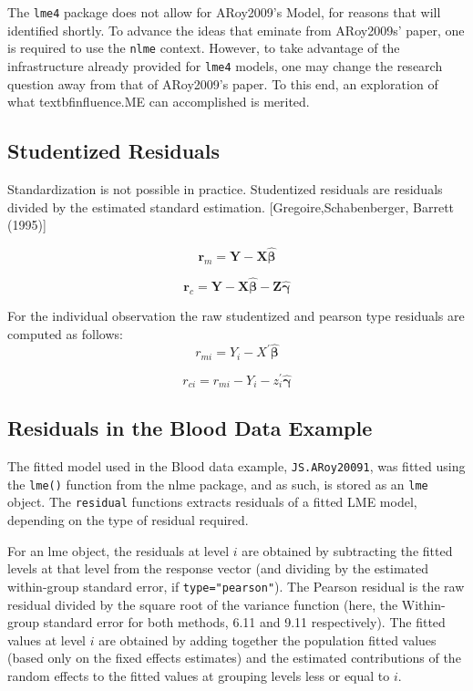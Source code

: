 \documentclass[12pt, a4paper]{report}
\theoremstyle{plain}
\theoremstyle{definition}
\theoremstyle{remark}
\begin{document}
	The \texttt{lme4} package does not allow for ARoy2009's Model, for reasons that will identified shortly.
	To advance the ideas that eminate from ARoy2009s' paper, one is required to use the \texttt{nlme} context. However, to take advantage of the infrastructure already provided for \texttt{lme4} models, one may change the research question away from that of ARoy2009's paper. 
	To this end, an exploration of what textbf{influence.ME} can accomplished is merited.
	\subsection{Studentized Residuals}
	Standardization is not possible in practice. Studentized residuals are residuals divided by the estimated standard estimation.
	[Gregoire,Schabenberger, Barrett (1995)]
	
	\[\boldsymbol{r}_{m} = \boldsymbol{Y} -  \boldsymbol{X} \boldsymbol{\hat{\beta}} \]
	
	\[\boldsymbol{r}_{c} = \boldsymbol{Y} -  \boldsymbol{X} \boldsymbol{\hat{\beta}} -  \boldsymbol{Z} \boldsymbol{\hat{\gamma}}\]
	
	For the individual observation the raw studentized and pearson type residuals are computed as follows:
	\[r_{mi} =Y_{i} -X^{\prime} \boldsymbol{\hat{\beta}}\]
	
	\[r_{ci} = r_{mi} - Y_{i} - z_{i}^{\prime} \boldsymbol{\hat{\gamma}}\]
	
	
	\subsection{Residuals in the Blood Data Example}
	The fitted model used in the Blood data example, \texttt{JS.ARoy20091}, was fitted using the \texttt{lme()} function from the nlme package, and as such, is stored as an \texttt{lme} object. The \texttt{residual} functions extracts residuals of a fitted LME model, depending on the type of residual required.
	
	For an lme object, the residuals at level $i$ are obtained by subtracting the fitted levels at that level from the response vector (and dividing by the estimated within-group standard error, if \texttt{type="pearson"}). The Pearson residual is the raw residual divided by the square root of the variance function (here, the Within-group standard error for both methods, 6.11 and 9.11 respectively). The fitted values at level $i$ are obtained by adding together the population fitted values (based only on the fixed effects estimates) and the estimated contributions of the random effects to the fitted values at grouping levels less or equal to $i$.
	
\end{document}
